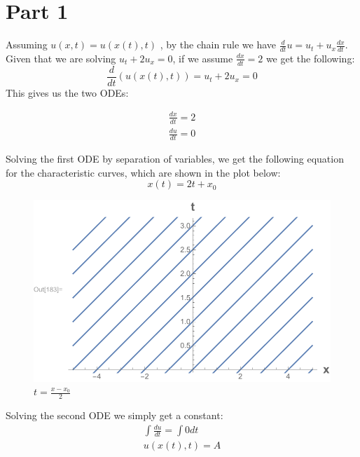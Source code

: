 \documentclass{article}
\begin{document}
\section*{Part 1}
Assuming $u(x, t) = u(x(t), t)$ , by the chain rule we have $\frac{d}{dt}u = u_t + u_x\frac{dx}{dt}$. Given that we are solving $u_t + 2u_x = 0$, if we assume $\frac{dx}{dt} = 2$ we get the following:
\begin{equation}
\frac{d}{dt}(u(x(t), t)) = u_t + 2u_x = 0
\end{equation}
This gives us the two ODEs:
\begin{tcolorbox}[minipage,colback=white,arc=0pt,outer arc=0pt]
\begin{equation}
\begin{aligned}
\frac{dx}{dt} = 2\\
\frac{du}{dt} = 0
\end{aligned}
\end{equation}
\end{tcolorbox}
Solving the first ODE by separation of variables, we get the following equation for the characteristic curves, which are shown in the plot below:
\begin{equation}
x(t) = 2t + x_0
\end{equation}
\begin{figure}[H]
  \centering
    \includegraphics[width=\textwidth]{hw_12_plot1.pdf}
    \caption{$t = \frac{x-x_0}{2}$}
\end{figure}
Solving the second ODE we simply get a constant:
\begin{equation}
\begin{aligned}
\int \frac{du}{dt} = \int 0dt\\
u(x(t), t) = A
\end{aligned}
\end{equation}
\end{document}
